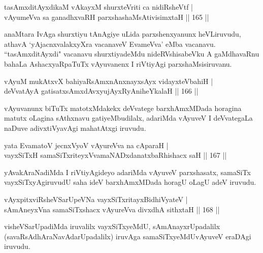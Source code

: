 \begin{shl}
tasAmxditAyxdikaM vAkayxM shurxteVriti ca nidiRsheVtf |\\
vAyumeVva sa ganadhxvaRH parxshashaMsAtivisimxtaH \hfill || 165 ||
\end{shl}

\begin{artha}
anaMtara IvAga shurxtiyu tAnAgiye uLida parxshenxyanunx heVLiruvudu, athavA `yAjacnxvalakxyXra vacanaveV EvameVva' eMba vacanavu. ``tasAmxditAyxdi" vacanavu shurxtiyadeMdu nideRVshisabeVku \mdash A gaMdhavaRnu bahaLa AshacxyaRpaTuTx vAyuvanenx I riVtiyAgi parxshaMsisiruvanu.
\end{artha}


\begin{shl}
vAyuM mukAtxvX bahiyaRsAmxnAnxnayxsAyx vidayxteVbahiH |\\
deVvatAyA gatisatxsAmxdAvxyujAyxRyAniheYkalaH \hfill || 166 ||
\end{shl}

\begin{artha}
vAyuvanunx biTuTx matotxMdakekx deVvatege barxhAmxMDada horagina matutx oLagina sAthxnavu gatiyeMbudilalx, adariMda vAyuveV I deVvategaLa naDuve adivxtiVyavAgi mahatAtxgi iruvudu.
\end{artha}

\begin{shl}
yata EvamatoV jecnxVyoV vAyureVva na cAparaH |\\
vayxSiTxH samaSiTxriteyxVvamaNADxdanatxbaRhishacx saH \hfill || 167 ||
\end{shl}

\begin{artha}
yAvakAraNadiMda I riVtiyAgideyo adariMda vAyuveV parxshasatx, samaSiTx vayxSiTxyAgiruvudU saha ideV barxhAmxMDada horagU oLagU adeV iruvudu.
\end{artha}


\begin{shl}
vAyxpitxviRsheVSarUpeVNa vayxSiTxritayxBidhiVyateV |\\
sAmAneyxVna samaSiTxshacx vAyureVva divxdhA sithxtaH \hfill || 168 ||
\end{shl}

\begin{artha}
visheVSarUpadiMda iruvalilx vayxSiTxyeMdU, sAmAnayxrUpadalilx (savaR\-sAdhAraNavAdarUpadalilx) iruvAga samaSiTxyeMdU\break vAyuveV eraDAgi iruvudu.
\end{artha}

